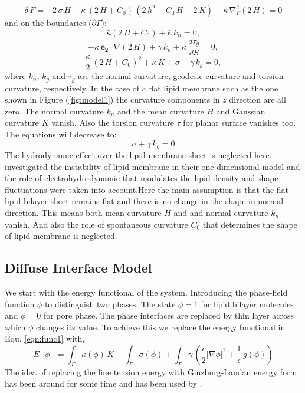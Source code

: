 \documentclass[english,12pt]{article}
\begin{document}
\begin{equation}
\delta\,F=-2\,\sigma\,H+\kappa\,\left(2\,H+C_{0}\right)\,\left(2\,h^{2}-C_{0}\,H-2\,K\right)+\kappa\,\nabla_{\Gamma}^{2}\left(2\,H\right)=0
\label{eqn:derv2}
\end{equation}
and on the boundaries ($\partial\Gamma$):
\begin{equation}
\bar{\kappa}\left(2\,H+C_{0}\right)+\bar{\kappa}\,k_{n}=0,
\label{eqn:edgebc1}
\end{equation}
\begin{equation}
-\kappa\,\mathbf{e_{2}}\cdot\nabla\left(2\,H\right) + \gamma\,k_{n}+\bar{\kappa}\,\frac{d\tau_{g}}{dS}=0,
\label{eqn:edgebc2}
\end{equation}
\begin{equation}
\frac{\kappa}{2}\,\left(2\,H+C_{0}\right)^{2}+\bar{\kappa}\,K+\sigma+\gamma\,k_{g}=0,
\label{eqn:edgebc3}
\end{equation}
where $k_{n}$, $k_{g}$ and $\tau_{g}$ are the normal curvature, geodesic curvature and torsion curvature, respectively. In the case of a flat lipid membrane such as the one shown in Figure (\ref{fig:model1}) the curvature components in $z$ direction are all zero. The normal curvature $k_n$ and the mean curvature $H$ and Gaussian curvature $K$ vanish. Also the torsion curvature $\tau$ for planar surface vanishes too. The equations will decrease to:
\begin{equation}
\sigma+\gamma\,k_{g}=0
\end{equation}
The hydrodynamic effect over the lipid membrane sheet is neglected here. \cite{:/content/aip/journal/pof2/23/4/10.1063/1.3567276} investigated the instability of lipid membrane in their one-dimensional model and the role of electrohydrodynamic that modulates the lipid density and shape fluctuations were taken into account.Here the main assumption is that the flat lipid bilayer sheet remains flat and there is no change in the shape in normal direction. This means both mean curvature $H$ and and normal curvature $k_{n}$ vanish. And also the role of spontaneous curvature $C_0$ that determines the shape of lipid membrane is neglected.
\subsection{Diffuse Interface Model}
We start with the energy functional of the system. Introducing the phase-field function $\phi$ to distinguish two phases. The state $\phi=1$ for lipid bilayer molecules and $\phi=0$ for pore phase. The phase interfaces are replaced by thin layer across which $\phi$ changes its value. To achieve this we replace the energy functional in Equ. \ref{eqn:func1} with,
\begin{equation}
	E\left[\phi\right]=\int_{\Gamma}\bar{\kappa}\left(\phi\right)\,K+\int_{\Gamma}\sigma\left(\phi\right)+\int_{\Gamma}\gamma\,\left(\frac{\epsilon}{2}|\nabla\phi|^{2}+\frac{1}{\epsilon}\,g\left(\phi\right) \right)
	\label{eqn:func2}
\end{equation}
The idea of replacing the line tension energy with Ginzburg-Landau energy form has been around for some time  and has been used by \cite{PhysRevE.79.031926}. 




 

\newpage


\end{document}
